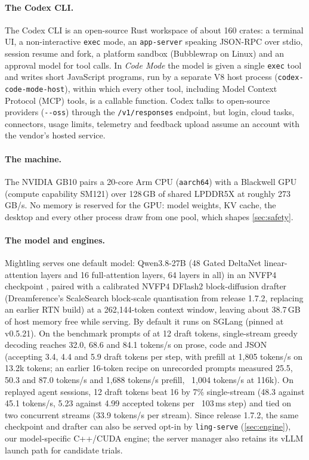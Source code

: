 \documentclass[11pt]{article}
\newcommand{\code}[1]{\texttt{#1}}
\begin{document}
\paragraph{The Codex CLI.} The Codex CLI \cite{openai2026codex} is an open-source Rust workspace of
about 160 crates: a terminal UI, a non-interactive \code{exec} mode, an \code{app-server} speaking
JSON-RPC over stdio, session resume and fork, a platform sandbox (Bubblewrap \cite{bubblewrap2024}
on Linux) and an approval model for tool calls. In \emph{Code Mode} the model is given a single
\code{exec} tool and writes short JavaScript programs, run by a separate V8 host process
(\code{codex-code-mode-host}), within which every other tool, including Model Context Protocol
(MCP) \cite{mcp2025spec} tools, is a callable function. Codex talks to open-source providers
(\code{-{}-oss}) through the \code{/v1/responses} endpoint, but login, cloud tasks,
connectors, usage limits, telemetry and feedback upload assume an account with the vendor's hosted
service.

\paragraph{The machine.} The NVIDIA GB10 pairs a 20-core Arm CPU (\code{aarch64}) with a Blackwell
GPU (compute capability SM121) over 128\,GB of shared LPDDR5X at roughly 273\,GB/s. No memory is
reserved for the GPU: model weights, KV cache, the desktop and every other process draw from one
pool, which shapes \cref{sec:safety}.

\paragraph{The model and engines.} Mightling serves one default model: Qwen3.8-27B \cite{qwen3tr}
(48 Gated DeltaNet linear-attention layers \cite{yang2024deltanet,yang2025gateddeltanet} and 16
full-attention layers, 64 layers in all) in an NVFP4 checkpoint \cite{nvfp4blog,ocpmx2023}, paired
with a calibrated NVFP4 DFlash2 block-diffusion drafter \cite{chen2026dflash,dflash2drafter}
(Dreamference's ScaleSearch block-scale quantisation from release 1.7.2, replacing an earlier RTN
build) at a 262{,}144-token context window, leaving about 38.7\,GB of host memory free while
serving. By default it runs on SGLang \cite{zheng2023sglang} (pinned at v0.5.21). On the benchmark
prompts of  at 12 draft tokens, single-stream greedy decoding reaches
32.0, 68.6 and 84.1 tokens/s on prose, code and JSON (accepting 3.4, 4.4 and 5.9 draft tokens per
step, with prefill at 1{,}805 tokens/s on 13.2k tokens; an earlier 16-token recipe on unrecorded
prompts measured 25.5, 50.3 and 87.0 tokens/s and 1{,}688 tokens/s prefill, ~1{,}004 tokens/s at
116k). On replayed agent sessions, 12 draft tokens beat 16 by 7\% single-stream (48.3 against
45.1 tokens/s, 5.23 against 4.99 accepted tokens per ~103\,ms step) and tied on two concurrent
streams (33.9 tokens/s per stream). Since release 1.7.2, the same checkpoint and drafter can also
be served opt-in by \code{ling-serve} (\cref{sec:engine}), our model-specific C++/CUDA engine; the
server manager also retains its vLLM \cite{kwon2023vllm} launch path for candidate trials.
\end{document}
